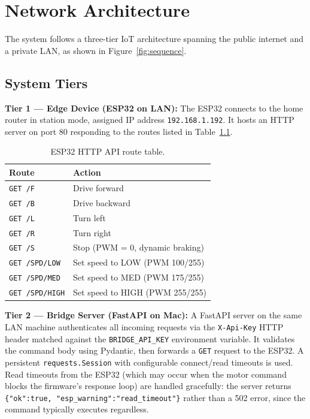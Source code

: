 \documentclass[12pt]{report}
\begin{document}
\chapter{Network Architecture}

The system follows a three-tier IoT architecture spanning the public internet and
a private LAN, as shown in Figure~\ref{fig:sequence}.

\section{System Tiers}

\textbf{Tier 1 --- Edge Device (ESP32 on LAN):}
The ESP32 connects to the home router in station mode, assigned IP address
\texttt{192.168.1.192}. It hosts an HTTP server on port 80 responding to the
routes listed in Table~\ref{tab:routes}.

\begin{table}[H]
    \centering
    \begin{tabular}{ll}
        \toprule
        \textbf{Route} & \textbf{Action} \\
        \midrule
        \texttt{GET /F}        & Drive forward \\
        \texttt{GET /B}        & Drive backward \\
        \texttt{GET /L}        & Turn left \\
        \texttt{GET /R}        & Turn right \\
        \texttt{GET /S}        & Stop (PWM = 0, dynamic braking) \\
        \texttt{GET /SPD/LOW}  & Set speed to LOW (PWM 100/255) \\
        \texttt{GET /SPD/MED}  & Set speed to MED (PWM 175/255) \\
        \texttt{GET /SPD/HIGH} & Set speed to HIGH (PWM 255/255) \\
        \bottomrule
    \end{tabular}
    \caption{ESP32 HTTP API route table.}
    \label{tab:routes}
\end{table}

\textbf{Tier 2 --- Bridge Server (FastAPI on Mac):}
A FastAPI server on the same LAN machine authenticates all incoming requests via
the \texttt{X-Api-Key} HTTP header matched against the \texttt{BRIDGE\_API\_KEY}
environment variable. It validates the command body using Pydantic, then forwards
a \texttt{GET} request to the ESP32. A persistent \texttt{requests.Session} with
configurable connect/read timeouts is used. Read timeouts from the ESP32 (which
may occur when the motor command blocks the firmware's response loop) are handled
gracefully: the server returns \texttt{\{"ok":true, "esp\_warning":"read\_timeout"\}}
rather than a 502 error, since the command typically executes regardless.
\end{document}
